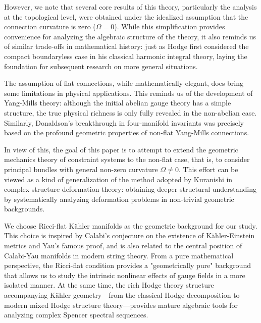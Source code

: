 \documentclass[a4paper,12pt]{extarticle}
\theoremstyle{definition}
\begin{document}
However, we note that several core results of this theory, particularly the analysis at the topological level, were obtained under the idealized assumption that the connection curvature is zero ($\Omega = 0$). While this simplification provides convenience for analyzing the algebraic structure of the theory, it also reminds us of similar trade-offs in mathematical history: just as Hodge first considered the compact boundaryless case in his classical harmonic integral theory\cite{hodge1941theory}, laying the foundation for subsequent research on more general situations.

The assumption of flat connections, while mathematically elegant, does bring some limitations in physical applications. This reminds us of the development of Yang-Mills theory\cite{yang1954conservation}: although the initial abelian gauge theory has a simple structure, the true physical richness is only fully revealed in the non-abelian case. Similarly, Donaldson's breakthrough in four-manifold invariants\cite{donaldson1983instanton} was precisely based on the profound geometric properties of non-flat Yang-Mills connections.

In view of this, the goal of this paper is to attempt to extend the geometric mechanics theory of constraint systems to the non-flat case, that is, to consider principal bundles with general non-zero curvature $\Omega \neq 0$. This effort can be viewed as a kind of generalization of the method adopted by Kuranishi in complex structure deformation theory\cite{kuranishi1962deformations}: obtaining deeper structural understanding by systematically analyzing deformation problems in non-trivial geometric backgrounds.

We choose Ricci-flat Kähler manifolds as the geometric background for our study. This choice is inspired by Calabi's conjecture on the existence of Kähler-Einstein metrics\cite{calabi1957differential} and Yau's famous proof\cite{yau1978ricci}, and is also related to the central position of Calabi-Yau manifolds in modern string theory\cite{candelas1985vacuum}. From a pure mathematical perspective, the Ricci-flat condition provides a "geometrically pure" background that allows us to study the intrinsic nonlinear effects of gauge fields in a more isolated manner. At the same time, the rich Hodge theory structure accompanying Kähler geometry—from the classical Hodge decomposition\cite{hodge1941theory} to modern mixed Hodge structure theory\cite{deligne1971theorie}—provides mature algebraic tools for analyzing complex Spencer spectral sequences.
\end{document}
